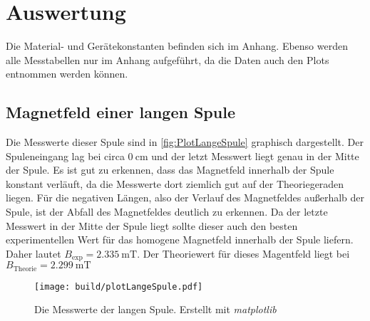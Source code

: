 \section{Auswertung}
\label{sec:Auswertung}
Die Material- und Gerätekonstanten befinden sich im Anhang. Ebenso werden alle Messtabellen nur im Anhang aufgeführt, da die Daten auch den Plots entnommen werden können.
\subsection{Magnetfeld einer langen Spule}
\label{subsec:A_langeSpule}
Die Messwerte dieser Spule sind in \autoref{fig:PlotLangeSpule} graphisch dargestellt. Der Spuleneingang lag bei circa $0\:\unit{\centi\metre}$ und der letzt Messwert liegt genau in der Mitte der Spule.
Es ist gut zu erkennen, dass das Magnetfeld innerhalb der Spule konstant verläuft, da die Messwerte dort ziemlich gut auf der Theoriegeraden liegen. Für die negativen Längen, also der Verlauf
des Magnetfeldes außerhalb der Spule, ist der Abfall des Magnetfeldes deutlich zu erkennen. Da der letzte Messwert in der Mitte der Spule liegt sollte dieser auch den besten experimentellen Wert
für das homogene Magnetfeld innerhalb der Spule liefern. Daher lautet $B_{\text{exp}} = 2.335\:\unit{\milli\tesla}$. Der Theoriewert für dieses Magentfeld liegt bei $B_{\text{Theorie}} = 2.299\:\unit{\milli\tesla}$
\begin{figure}
    \centering
    \caption{Die Messwerte der langen Spule. Erstellt mit \textit{matplotlib} \cite{matplotlib}}
    \label{fig:PlotLangeSpule}
    \texttt{[image: build/plotLangeSpule.pdf]}
\end{figure}
